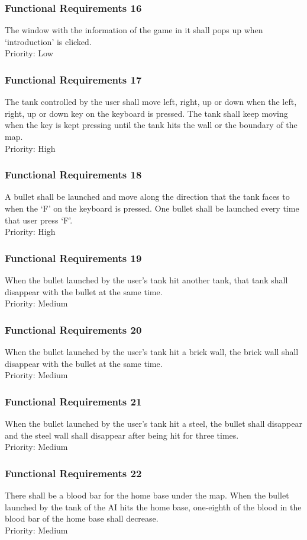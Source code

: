\documentclass[12pt, titlepage]{article}
\begin{document}
\subsubsection{Functional Requirements 16} The window with the information of the game in it shall pops up when 
`introduction' is clicked.\\Priority: Low
\subsubsection{Functional Requirements 17} The tank controlled by the user shall move left, right, up or down when 
the left, right, up or down key on the keyboard is pressed. The tank shall keep
 moving when the key is kept pressing until the tank hits the wall or the 
 boundary of the map.\\Priority: High
\subsubsection{Functional Requirements 18} A bullet shall be launched and move along the direction that the tank
 faces to when the `F' on the keyboard is pressed. One bullet shall be launched 
 every time that user press `F'.\\Priority: High
\subsubsection{Functional Requirements 19} When the bullet launched by the user's tank hit another tank, that tank 
shall disappear with the bullet at the same time.\\Priority: Medium
\subsubsection{Functional Requirements 20} When the bullet launched by the user's tank hit a brick wall, the brick 
wall shall disappear with the bullet at the same time.\\Priority: Medium
\subsubsection{Functional Requirements 21} When the bullet launched by the user's tank hit a steel, the bullet shall 
disappear and the steel wall shall disappear after being hit for three times.\\Priority: Medium
\subsubsection{Functional Requirements 22}There shall be a blood bar for the home base under the map. When 
the bullet launched by the tank of the AI hits the  home base, one-eighth of the blood in the blood bar of the home base 
shall decrease.\\Priority: Medium
\end{document}
